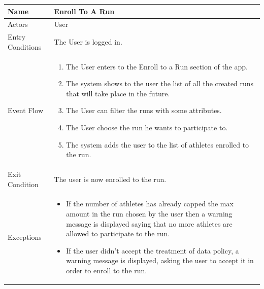 \begin{enumerate}
\FloatBarrier
\begin{table}[h]
\begin{tabular}{|l|p{}|}
\hline
Name             & Enroll To A Run \\ \hline
Actors           & User  \\ \hline
Entry Conditions & The User is logged in.    \\ \hline
Event Flow       & \begin{enumerate}
            \item The User enters to the Enroll to a Run section of the app.
            \item The system shows to the user the list of all the created runs that will take place in the future.
            \item The User can filter the runs with some attributes.
            \item The User choose the run he wants to participate to.
            \item The system adds the user to the list of athletes enrolled to the run.
        \end{enumerate}\\ \hline
Exit Condition   & The user is now enrolled to the run.\\ \hline
Exceptions       & \begin{itemize}
\item If the number of athletes has already capped the max amount in the run chosen by the user then a warning message is displayed saying that no more athletes are allowed to participate to the run.
\item If the user didn't accept the treatment of data policy, a warning message is displayed, asking the user to accept it in order to enroll to the run.
\end{itemize}\\ \hline
\end{tabular}
\end{table}
\FloatBarrier


\end{enumerate}
